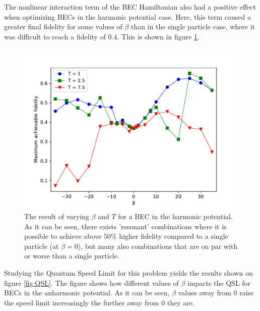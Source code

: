 \documentclass[aps,pra,reprint,superscriptaddress]{revtex4-1}
\begin{document}
The nonlinear interaction term of the BEC Hamiltonian also had a positive effect when optimizing BECs in the harmonic potential case. Here, this term caused a greater final fidelity for some values of $\beta$ than in the single particle case, where it was difficult to reach a fidelity of $0.4$. This is shown in figure \ref{fig:HO}.\\
\begin{figure}[h]
	\includegraphics[width=\columnwidth]{graphics/betaTHO.pdf}
	\caption{The result of varying $\beta$ and $T$ for a BEC in the harmonic potential. As it can be seen, there exists 'resonant' combinations where it is possible to achieve above $50\%$ higher fidelity compared to a single particle (at $\beta=0$), but many also combinations that are on par with or worse than a single particle.}
	\label{fig:HO}
\end{figure}

Studying the Quantum Speed Limit for this problem yields the results shown on figure \ref{fig:QSL}. The figure shows how different values of $\beta$ impacts the QSL for BECs in the anharmonic potential. As it can be seen, $\beta$ values away from 0 raise the speed limit increasingly the further away from 0 they are. \\
\end{document}
